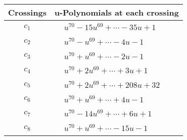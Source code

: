 \documentclass[1p]{elsarticle_modified}
\theoremstyle{definition}
\begin{document}
\begin{tabular}{m{50pt}|m{274pt}}
Crossings & \hspace{64pt}u-Polynomials at each crossing \\
\hline $$\begin{aligned}c_{1}\end{aligned}$$&$\begin{aligned}
&u^{70}-15 u^{69}+\cdots-35 u+1
\end{aligned}$\\
\hline $$\begin{aligned}c_{2}\end{aligned}$$&$\begin{aligned}
&u^{70}- u^{69}+\cdots-4 u-1
\end{aligned}$\\
\hline $$\begin{aligned}c_{3}\end{aligned}$$&$\begin{aligned}
&u^{70}+u^{69}+\cdots-2 u-1
\end{aligned}$\\
\hline $$\begin{aligned}c_{4}\end{aligned}$$&$\begin{aligned}
&u^{70}+2 u^{69}+\cdots+3 u+1
\end{aligned}$\\
\hline $$\begin{aligned}c_{5}\end{aligned}$$&$\begin{aligned}
&u^{70}+2 u^{69}+\cdots+208 u+32
\end{aligned}$\\
\hline $$\begin{aligned}c_{6}\end{aligned}$$&$\begin{aligned}
&u^{70}+u^{69}+\cdots+4 u-1
\end{aligned}$\\
\hline $$\begin{aligned}c_{7}\end{aligned}$$&$\begin{aligned}
&u^{70}-14 u^{69}+\cdots+6 u+1
\end{aligned}$\\
\hline $$\begin{aligned}c_{8}\end{aligned}$$&$\begin{aligned}
&u^{70}+u^{69}+\cdots-15 u-1
\end{aligned}$\\

\end{tabular}
\end{document}
